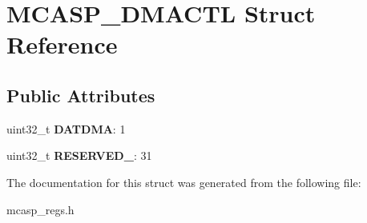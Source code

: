 \hypertarget{structMCASP__DMACTL}{\section{M\-C\-A\-S\-P\-\_\-\-D\-M\-A\-C\-T\-L Struct Reference}
\label{structMCASP__DMACTL}
}
\subsection*{Public Attributes}
\begin{DoxyCompactItemize}
\item 
\hypertarget{structMCASP__DMACTL_a3d610eeefcdc84b8c994360f85565d92}{uint32\-\_\-t {\bfseries D\-A\-T\-D\-M\-A}\-: 1}\label{structMCASP__DMACTL_a3d610eeefcdc84b8c994360f85565d92}

\item 
\hypertarget{structMCASP__DMACTL_a5117ee96c8947fb19743dc4ca99029fd}{uint32\-\_\-t {\bfseries R\-E\-S\-E\-R\-V\-E\-D\-\_}\-: 31}\label{structMCASP__DMACTL_a5117ee96c8947fb19743dc4ca99029fd}

\end{DoxyCompactItemize}


The documentation for this struct was generated from the following file\-:\begin{DoxyCompactItemize}
\item 
mcasp\-\_\-regs.\-h\end{DoxyCompactItemize}
